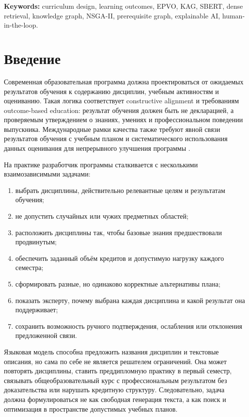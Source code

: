 \documentclass[twoside,11pt]{article}
\begin{document}
\medskip
\noindent\textbf{Keywords:}
curriculum design, learning outcomes, EPVO, KAG, SBERT, dense retrieval, knowledge graph, NSGA-II, prerequisite graph, explainable AI, human-in-the-loop.

\section{Введение}

Современная образовательная программа должна проектироваться от ожидаемых результатов обучения к содержанию дисциплин, учебным активностям и оцениванию. Такая логика соответствует constructive alignment \cite{Biggs1996} и требованиям outcome-based education: результат обучения должен быть не декларацией, а проверяемым утверждением о знаниях, умениях и профессиональном поведении выпускника. Международные рамки качества также требуют явной связи результатов обучения с учебным планом и систематического использования данных оценивания для непрерывного улучшения программы \cite{ABET2025,CDIO2022,Tuning2003}.

На практике разработчик программы сталкивается с несколькими взаимозависимыми задачами:
\begin{enumerate}[label=(\arabic*)]
  \item выбрать дисциплины, действительно релевантные целям и результатам обучения;
  \item не допустить случайных или чужих предметных областей;
  \item расположить дисциплины так, чтобы базовые знания предшествовали продвинутым;
  \item обеспечить заданный объём кредитов и допустимую нагрузку каждого семестра;
  \item сформировать разные, но одинаково корректные альтернативы плана;
  \item показать эксперту, почему выбрана каждая дисциплина и какой результат она поддерживает;
  \item сохранить возможность ручного подтверждения, ослабления или отклонения предложенной связи.
\end{enumerate}

Языковая модель способна предложить названия дисциплин и текстовые описания, но сама по себе не является решателем ограничений. Она может повторять дисциплины, ставить преддипломную практику в первый семестр, связывать общеобразовательный курс с профессиональным результатом без доказательства или нарушать кредитную структуру. Следовательно, задача должна формулироваться не как свободная генерация текста, а как поиск и оптимизация в пространстве допустимых учебных планов.
\end{document}
